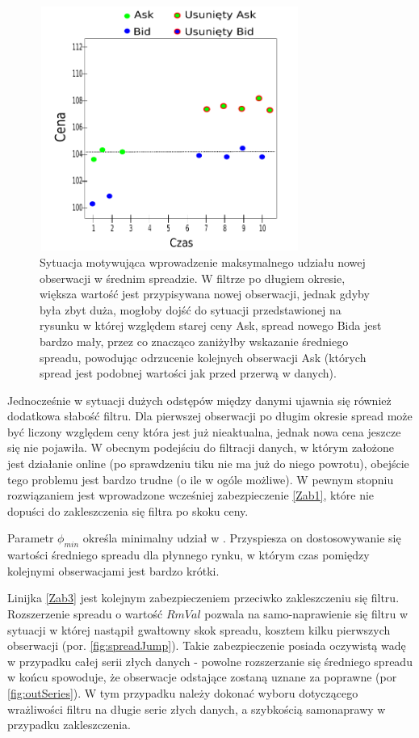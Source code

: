 \documentclass[a4paper,12pt,openany, DIV=calc, headsepline]{scrbook}
\begin{document}
\begin{figure}[h]
  \centering
  \includegraphics[width=85mm, height=80mm]{wykresy/longTime}
  \caption{Sytuacja motywująca wprowadzenie maksymalnego udziału nowej obserwacji w średnim spreadzie. W filtrze po długiem okresie, większa wartość jest przypisywana nowej obserwacji, jednak gdyby była zbyt duża, mogłoby dojść do sytuacji przedstawionej na rysunku w której względem starej ceny Ask, spread nowego Bida jest bardzo mały, przez co znacząco zaniżyłby wskazanie średniego spreadu, powodując odrzucenie kolejnych obserwacji Ask (których spread jest podobnej wartości jak przed przerwą w danych).}
  \label{fig:longTime}
\end{figure}

Jednocześnie w sytuacji dużych odstępów między danymi ujawnia się również dodatkowa słabość filtru. Dla pierwszej obserwacji po długim okresie spread może być liczony względem ceny która jest już nieaktualna, jednak nowa cena jeszcze się nie pojawiła. W obecnym podejściu do filtracji danych, w którym założone jest działanie online (po sprawdzeniu tiku nie ma już do niego powrotu), obejście tego problemu jest bardzo trudne (o ile w ogóle możliwe). W pewnym stopniu rozwiązaniem jest wprowadzone wcześniej zabezpieczenie \ref{Zab1}, które nie dopuści do zakleszczenia się filtra po skoku ceny.

Parametr $\phi_{min}$ określa minimalny udział \Spt w \MSpn. Przyspiesza on dostosowywanie się wartości średniego spreadu dla płynnego rynku, w którym czas pomiędzy kolejnymi obserwacjami jest bardzo krótki.

Linijka \ref{Zab3} jest kolejnym zabezpieczeniem przeciwko zakleszczeniu się filtru. Rozszerzenie spreadu o wartość $RmVal$ pozwala na samo-naprawienie się filtru w sytuacji w której nastąpił gwałtowny skok spreadu, kosztem kilku pierwszych obserwacji (por. \ref{fig:spreadJump}). Takie zabezpieczenie posiada oczywistą wadę w przypadku całej serii złych danych - powolne rozszerzanie się średniego spreadu w końcu spowoduje, że obserwacje odstające zostaną uznane za poprawne (por \ref{fig:outSeries}). W tym przypadku należy dokonać wyboru dotyczącego wrażliwości filtru na długie serie złych danych, a szybkością samonaprawy w przypadku zakleszczenia. 
\end{document}
